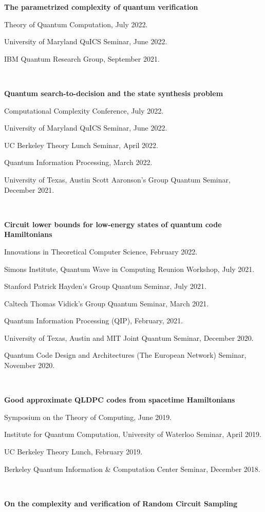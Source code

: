 \documentclass[11pt]{article}
\begin{document}
\textbf{The parametrized complexity of quantum verification}

Theory of Quantum Computation, July 2022.

University of Maryland QuICS Seminar, June 2022.

IBM Quantum Research Group, September 2021.

\

\textbf{Quantum search-to-decision and the state synthesis problem}

Computational Complexity Conference, July 2022.

University of Maryland QuICS Seminar, June 2022.

UC Berkeley Theory Lunch Seminar, April 2022.

Quantum Information Processing, March 2022.

University of Texas, Austin Scott Aaronson's Group Quantum Seminar, December 2021.

\

\textbf{Circuit lower bounds for low-energy states of quantum code Hamiltonians}

Innovations in Theoretical Computer Science, February 2022.

Simons Institute, Quantum Wave in Computing Reunion Workshop, July 2021.

Stanford Patrick Hayden's Group Quantum Seminar, July 2021.

Caltech Thomas Vidick's Group Quantum Seminar, March 2021.

Quantum Information Processing (QIP), February, 2021.

University of Texas, Austin and MIT Joint Quantum Seminar, December 2020. 

Quantum Code Design and Architectures (The European Network) Seminar, November 2020.

\

\textbf{Good approximate QLDPC codes from spacetime Hamiltonians}

Symposium on the Theory of Computing, June 2019.

Institute for Quantum Computation, University of Waterloo Seminar, April 2019.

UC Berkeley Theory Lunch, February 2019.

Berkeley Quantum Information \& Computation Center Seminar, December 2018.

\

\textbf{On the complexity and verification of Random Circuit Sampling}
\end{document}
